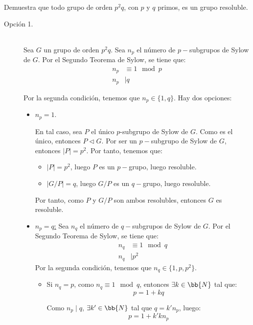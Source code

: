\begin{ejercicio}
    Demuestra que todo grupo de orden $p^2q$, con $p$ y $q$ primos, es un grupo resoluble.\\

    \begin{description}
        \item [Opción 1.]~\\
    Sea $G$ un grupo de orden $p^2q$. Sea $n_p$ el número de $p-$subgrupos de Sylow de $G$. Por el Segundo Teorema de Sylow, se tiene que:
    \begin{align*}
        n_p &\equiv 1 \mod p \\
        n_p &\mid q
    \end{align*}

    Por la segunda condición, tenemos que $n_p\in \{1,q\}$.
    Hay dos opciones:
    \begin{itemize}
        \item \ul{$n_p=1$}.
        
        En tal caso, sea $P$ el único $p$-subgrupo de Sylow de $G$. Como es el único, entonces $P\lhd G$. Por ser un $p-$subgrupo de Sylow de $G$, entonces $|P|=p^2$. Por tanto, tenemos que:
        \begin{itemize}
            \item $|P|=p^2$, luego $P$ es un $p-$grupo, luego resoluble.
            \item $|G/P|=q$, luego $G/P$ es un $q-$grupo, luego resoluble.
        \end{itemize}
        Por tanto, como $P$ y $G/P$ son ambos resolubles, entonces $G$ es resoluble.
        
        \item \ul{$n_p=q$:} Sea $n_q$ el número de $q-$subgrupos de Sylow de $G$. Por el Segundo Teorema de Sylow, se tiene que:
        \begin{align*}
            n_q &\equiv 1 \mod q \\
            n_q &\mid p^2
        \end{align*}
        Por la segunda condición, tenemos que $n_q\in \{1,p,p^2\}$.
        \begin{itemize}
            \item Si $n_q=p$, como $n_q\equiv 1 \mod q$, entonces $\exists k\in\bb{N}$ tal que:
            \begin{equation*}
                p = 1+ kq
            \end{equation*}

            Como $n_p\mid q$, $\exists k'\in\bb{N}$ tal que $q=k'n_p$, luego:
            \begin{equation*}
                p = 1 + k'kn_p
            \end{equation*}


\end{itemize}
\end{itemize}
\end{description}
\end{ejercicio}
